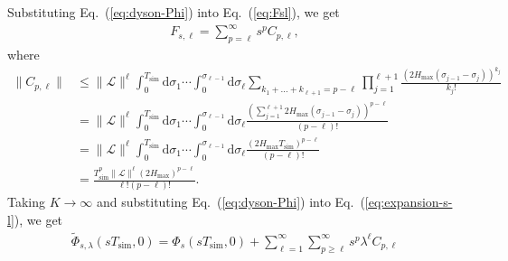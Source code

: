 \documentclass[11pt]{article}
\newcommand{\eq}[1]{(\ref{eq:#1})}
\renewcommand{\d}{\mathrm{d}}
\renewcommand{\L}{\mathcal{L}}
\newcommand{\simu}{\mathrm{sim}}
\begin{document}
Substituting Eq.~\eq{dyson-Phi} into Eq.~\eq{Fsl}, we get \begin{align*}
    F_{s,\ell} = \sum_{p = \ell}^{\infty} s^p C_{p,\ell},
\end{align*}
where \begin{align}
    \|C_{p,\ell}\| &\le \|\L\|^{\ell} \int_{0}^{T_{\simu}}\d\sigma_1 \cdots \int_{0}^{\sigma_{\ell-1}} \d\sigma_{\ell} \sum_{k_1+\dots+k_{\ell+1}=p-\ell} \prod_{j=1}^{\ell+1} \frac{(2 H_{\max }(\sigma_{j-1}-\sigma_j))^{k_j}}{k_j!}\\
     &= \|\L\|^{\ell}\int_{0}^{T_{\simu}}\d\sigma_1 \cdots \int_{0}^{\sigma_{\ell-1}} \d\sigma_{\ell} \frac{(\sum_{j = 1}^{\ell+1}2 H_{\max }(\sigma_{j-1}-\sigma_j))^{p-\ell}}{(p-\ell)!}\\
    &= \|\L\|^{\ell} \int_{0}^{T_{\simu}}\d\sigma_1 \cdots \int_{0}^{\sigma_{\ell-1}} \d\sigma_{\ell} \frac{(2H_{\max}T_{\simu})^{p-\ell}}{(p-\ell)!}\\
    & =  \frac{T_{\simu}^p \|\L\|^\ell (2H_{\max})^{p-\ell}}{\ell!(p-\ell)!}.
\end{align}
Taking $K\to \infty$ and substituting Eq.~\eq{dyson-Phi} into Eq.~\eq{expansion-s-l}, we get 
\begin{align}
\label{eq:expansion-s}
    \tilde{\Phi}_{s,\lambda}(s T_{\simu}, 0) = \Phi_s(s T_{\simu}, 0)+\sum_{\ell=1}^{\infty}\sum_{p\ge \ell}^{\infty}s^p \lambda^{\ell} C_{p,\ell} 
\end{align}
\end{document}
